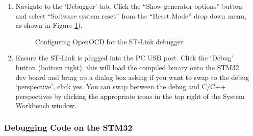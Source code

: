 \documentclass{UoNMCHA}
\numberwithin{equation}{section}
\begin{document}
\begin{enumerate}
    \item Navigate to the `Debugger' tab. Click the ``Show generator options'' button and select ``Software system reset'' from the ``Reset Mode'' drop down menu, as shown in Figure \ref{fig:openocdconfig}).
   
    \begin{figure}[H]
    \caption{Configuring OpenOCD for the ST-Link debugger.}
    \label{fig:openocdconfig}
    \end{figure}

    \item Ensure the ST-Link is plugged into the PC USB port.  Click the `Debug' button (bottom right), this will load the compiled binary onto the STM32 dev board and bring up a dialog box asking if you want to swap to the debug `perspective', click yes. You can swap between the debug and C/C++ perspectives by clicking the appropriate icons in the top right of the System Workbench window.


\end{enumerate}

\pagebreak

\subsubsection{Debugging Code on the STM32}
\end{document}
